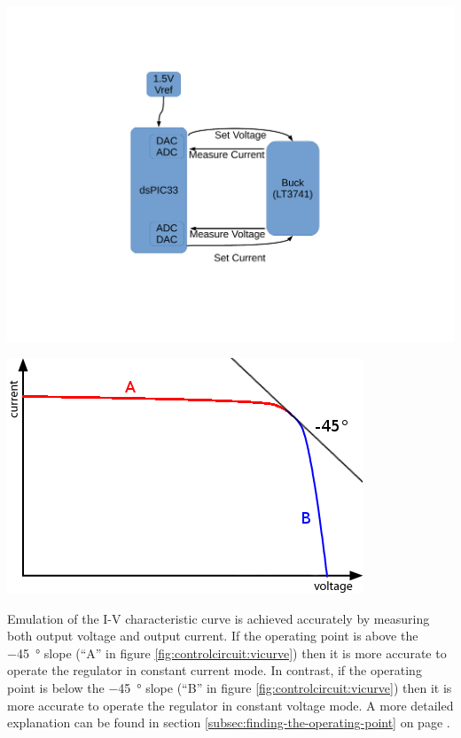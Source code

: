 \begin{minipage}{0.5\textwidth}
    \center
    \includegraphics[width=\textwidth,trim=140 140 120 100,clip]{images/block-diag-control.pdf}
    \label{fig:controlcircuit:schcematic}
\end{minipage}
\begin{minipage}{0.5\textwidth}
    \center
    \includegraphics[width=\textwidth]{images/vi-curve.png}
    \label{fig:controlcircuit:vicurve}
\end{minipage}

Emulation of the I-V characteristic  curve  is  achieved  accurately by measuring
both output voltage and output current. If  the  operating  point  is  above the
\SI{-45}{\degree} slope (``A'' in  figure \ref{fig:controlcircuit:vicurve}) then
it is more accurate  to  operate  the  regulator  in  constant  current mode. In
contrast, if the operating point is below  the \SI{-45}{\degree} slope (``B'' in
figure \ref{fig:controlcircuit:vicurve}) then it is more accurate to operate the
regulator in constant voltage mode. A more detailed explanation can  be found in
section         \ref{subsec:finding-the-operating-point}         on         page
\pageref{subsec:finding-the-operating-point}.


